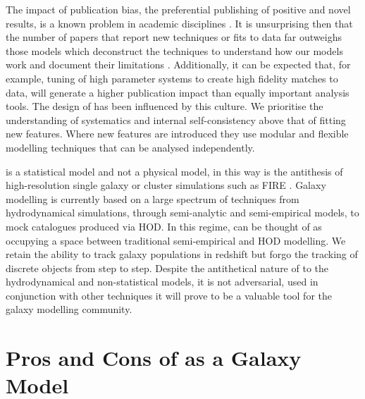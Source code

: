 The impact of publication bias, the preferential publishing of positive and novel results, is a known problem in academic disciplines \cite[e.g.][]{Song2010DisseminationBiases}. It is unsurprising then that the number of papers that report new techniques or fits to data far outweighs those models which deconstruct the techniques to understand how our models work and document their limitations \cite[e.g.][]{vandenBosch2017DissectingSimulation, vandenBosch2018DisruptionFiction, Asquith2018CosmicModels}. Additionally, it can be expected that, for example, tuning of high parameter systems to create high fidelity matches to data, will generate a higher publication impact than equally important analysis tools. The design of \steel has been influenced by this culture. We prioritise the understanding of systematics and internal self-consistency above that of fitting new features. Where new features are introduced they use modular and flexible modelling techniques that can be analysed independently.


\steel is a statistical model and not a physical model, in this way is the antithesis of high-resolution single galaxy or cluster simulations such as FIRE \cite{Hopkins2018FIRE-2Formation}. Galaxy modelling is currently based on a large spectrum of techniques from hydrodynamical simulations, through semi-analytic and semi-empirical models, to mock catalogues produced via HOD. In this regime, \steel can be thought of as occupying a space between traditional semi-empirical and HOD modelling. We retain the ability to track galaxy populations in redshift but forgo the tracking of discrete objects from step to step. Despite the antithetical nature of \steel to the hydrodynamical and non-statistical models, it is not adversarial, used in conjunction with other techniques it will prove to be a valuable tool for the galaxy modelling community. 

\section{Pros and Cons of \steel as a Galaxy Model}

